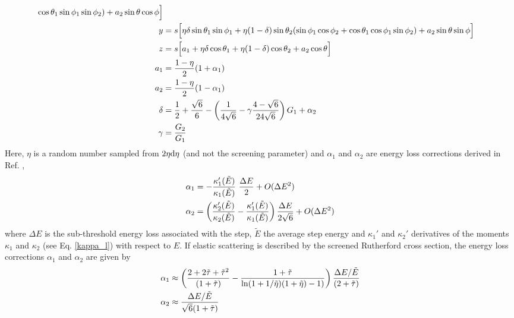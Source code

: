 \begin{itemize}
\begin{equation}
\begin{split}
\cos \theta_1 \sin \phi_1 \sin \phi_2 ) +
a_2 \sin \theta \cos \phi \Big] \\
y & = s \Big[ \eta \delta \sin \theta_1 \sin \phi_1 +
\eta (1 - \delta) \sin \theta_2 ( \sin \phi_1 \cos \phi_2 +
\cos \theta_1 \cos \phi_1 \sin \phi_2 ) +
a_2 \sin \theta \sin \phi \Big] \\
z & = s \Big[ a_1 + \eta \delta \cos \theta_1 +
\eta (1 - \delta) \cos \theta_2 +
a_2 \cos \theta \Big] \\
a_1 & = {1 - \eta \over 2} (1 + \alpha_1) \\
a_2 & = {1 - \eta \over 2} (1 - \alpha_1) \\
\delta & = {1 \over 2} + {\sqrt{6} \over 6} -
\left( {1 \over 4 \sqrt{6}} - \gamma {4 - \sqrt{6} \over 24 \sqrt{6}}
\right) G_1 + \alpha_2 \\
\gamma & = {G_2 \over G_1}
\end{split}
\end{equation}
Here, $\eta$ is a random number sampled from $2 \eta {\rm d} \eta$
(and not the screening parameter) and $\alpha_1$ and $\alpha_2$
are energy loss corrections derived in Ref. \cite{Ka99a},
\begin{equation}
\label{eloss_correction}
\begin{split}
\alpha_1 & = - {\kappa_1'(\tilde{E}) \over \kappa_1(\tilde{E})}~
{\Delta E \over 2} + O(\Delta E^2) \\
\alpha_2 & = \left( {\kappa_2'(\tilde{E}) \over \kappa_2(\tilde{E})}
- {\kappa_1'(\tilde{E}) \over \kappa_1(\tilde{E})} \right) {\Delta E \over
2 \sqrt{6} } + O(\Delta E^2)
\end{split}
\end{equation}
where $\Delta E$ is the sub-threshold energy loss associated
with the step, $\tilde{E}$ the average step energy and
$\kappa_1'$ and $\kappa_2'$ derivatives of the
moments $\kappa_1$ and $\kappa_2$ (see Eq. \eqref{kappa_l})
with respect to $E$.
If elastic scattering is described by the screened Rutherford
cross section, the energy loss corrections $\alpha_1$ and
$\alpha_2$ are given by
\begin{equation}
\label{eloss_correction_SR}
\begin{split}
\alpha_1 & \approx \left( {2 + 2 \tilde{\tau} + \tilde{\tau}^2 \over
(1 + \tilde{\tau}) } - {1 + \tilde{\tau} \over
\ln(1 + 1/\tilde{\eta}) (1 + \tilde{\eta}) - 1) } \right)
{\Delta E/\tilde{E} \over  (2 + \tilde{\tau})}
\\
\alpha_2 & \approx {\Delta E/\tilde{E} \over \sqrt{6} (1 + \tilde{\tau})
}
\end{split}
\end{equation}
\end{itemize}
